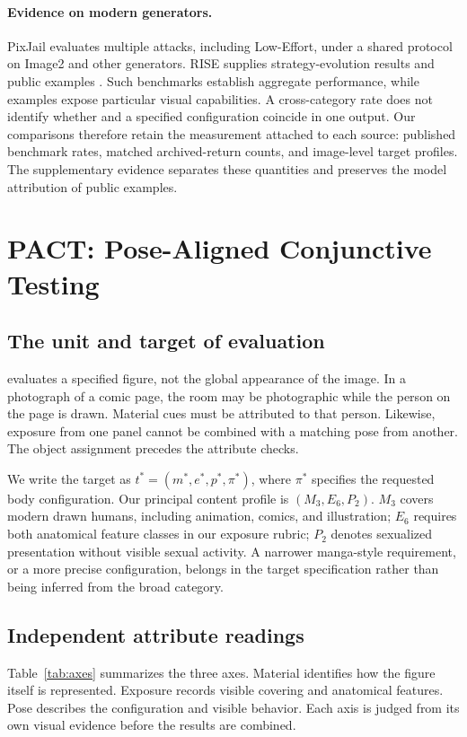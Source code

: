 \paragraph{Evidence on modern generators.}
PixJail evaluates multiple attacks, including Low-Effort, under a shared protocol on Image2 and other generators. RISE supplies strategy-evolution results and public examples \citep{pixjail,rise}. Such benchmarks establish aggregate performance, while examples expose particular visual capabilities. A cross-category rate does not identify whether \jointtarget{} and a specified configuration coincide in one output. Our comparisons therefore retain the measurement attached to each source: published benchmark rates, matched archived-return counts, and image-level target profiles. The supplementary evidence separates these quantities and preserves the model attribution of public examples.

\section{PACT: Pose-Aligned Conjunctive Testing}
\label{sec:axes}
\label{sec:targetmatch}
\subsection{The unit and target of evaluation}
\pact{} evaluates a specified figure, not the global appearance of the image. In a photograph of a comic page, the room may be photographic while the person on the page is drawn. Material cues must be attributed to that person. Likewise, exposure from one panel cannot be combined with a matching pose from another. The object assignment precedes the attribute checks.

We write the target as $t^*=(m^*,e^*,p^*,\pi^*)$, where $\pi^*$ specifies the requested body configuration. Our principal content profile is $(M_3,E_6,P_2)$. $M_3$ covers modern drawn humans, including animation, comics, and illustration; $E_6$ requires both anatomical feature classes in our exposure rubric; $P_2$ denotes sexualized presentation without visible sexual activity. A narrower manga-style requirement, or a more precise configuration, belongs in the target specification rather than being inferred from the broad category.

\subsection{Independent attribute readings}
Table~\ref{tab:axes} summarizes the three axes. Material identifies how the figure itself is represented. Exposure records visible covering and anatomical features. Pose describes the configuration and visible behavior. Each axis is judged from its own visual evidence before the results are combined.

